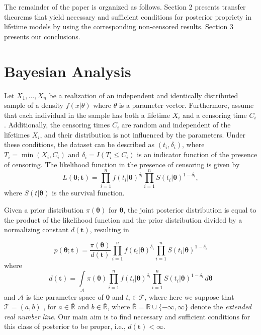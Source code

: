 \documentclass[]{interact}
\newcommand{\bs}{\boldsymbol}
\theoremstyle{plain}%
\theoremstyle{definition}
\theoremstyle{remark}
\begin{document}
The remainder of the paper is organized as follows. Section 2 presents transfer theorems that yield necessary and sufficient conditions for posterior propriety in lifetime models by using the corresponding non-censored results. Section 3 presents our conclusions.

\section{Bayesian Analysis}

Let $X_1,\ldots,X_n$ be a realization of an independent and identically distributed sample of a density $f(x|\theta)$ where $\theta$ is a parameter vector. Furthermore, assume that each individual in the sample has both a lifetime $X_i$ and a censoring time $C_i$. Additionally, the censoring times $C_i$ are random and independent of the lifetimes $X_i$, and their distribution is not influenced by the parameters. Under these conditions, the dataset can be described as $(t_i,\delta_i)$, where $T_i=\min(X_i,C_i)$ and $\delta_i=I(T_i\leq C_i)$ is an indicator function of the presence of censoring. The likelihood function in the presence of censoring is given by
\begin{equation}\label{lposteriord1}
L(\bs{\theta};\bs{t})=\prod_{i=1}^n f(t_i|\bs{\theta})^{\delta_i}\prod_{i=1}^n S(t_i|\bs{\theta})^{1-\delta_i},
\end{equation}
where $S(t|\boldsymbol{\theta})$ is the survival function.

Given a prior distribution $\pi(\bs{\theta})$ for $\bs{\theta}$, the joint posterior distribution is equal to the product of the likelihood function and the prior distribution divided by a normalizing constant $d(\bs{t})$, resulting in

\begin{equation}\label{posteriord1}
p(\bs{\theta;t})=\frac{\pi(\bs{\theta})}{d(\bs{t})}\prod_{i=1}^n f(t_i|\bs{\theta})^{\delta_i}\prod_{i=1}^n S(t_i|\bs{\theta})^{1-\delta_i}
\end{equation}
where
\begin{equation}\label{cposteriord1}
d(\bs{t})=\int\limits_{\mathcal{A}}\pi(\bs{\theta})\prod_{i=1}^n f(t_i|\bs{\theta})^{\delta_i}\prod_{i=1}^n S(t_i|\bs{\theta})^{1-\delta_i}\, d\bs{\theta}
\end{equation}
and $\mathcal{A}$ is the parameter space of $\bs{\theta}$ and $t_i\in \mathcal{T}$, where here we suppose that $\mathcal{T}=(a,b)$ , for $a\in \overline{\mathbb{R}}$ and $b\in \overline{\mathbb{R}}$, where  $\overline{\mathbb{R}} = \mathbb{R}\cup \{-\infty, \infty\}$ denote the \textit{extended real number line}. Our main aim is to find necessary and sufficient conditions for this class of posterior to be proper, i.e., $d(\bs{t})<\infty$.
  
\end{document}
